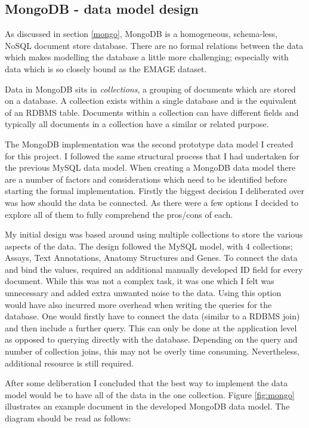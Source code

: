 \subsection{MongoDB  - data model design}\label{mongodesign}

As discussed in section \ref{mongo}, MongoDB is a homogeneous, schema-less, NoSQL document store database. There are no formal relations between the data which makes modelling the database a little more challenging; especially with data which is so closely bound as the EMAGE dataset.

Data in MongoDB sits in \textit{collections}, a grouping of documents which are stored on a database. A collection exists within a single database and is the equivalent of an RDBMS table. Documents within a collection can have different fields and typically all documents in a collection have a similar or related purpose. 

The MongoDB implementation was the second prototype data model I created for this project. I followed the same structural process that I had undertaken for the previous MySQL data model. When creating a MongoDB data model there are a number of factors and considerations which need to be identified before starting the formal implementation. Firstly the biggest decision I deliberated over was how should the data be connected. As there were a few options I decided to explore all of them to fully comprehend the pros/cons of each.

My initial design was based around using multiple collections to store the various aspects of the data. The design followed the MySQL model, with 4 collections; Assays, Text Annotations, Anatomy Structures and Genes. To connect the data and bind the values, required an additional manually developed ID field for every document. While this was not a complex task, it was one which I felt was unnecessary and added extra unwanted noise to the data. Using this option would have also incurred more overhead when writing the queries for the database. One would firstly have to connect the data (similar to a RDBMS join) and then include a further query. This can only be done at the application level as opposed to querying directly with the database. Depending on the query and number of collection joins, this may not be overly time consuming. Nevertheless, additional resource is still required. 

After some deliberation I concluded that the best way to implement the data model would be to have all of the data in the one collection. Figure \ref{fig:mongo} illustrates an example document in the developed MongoDB data model. The diagram should be read as follows:


